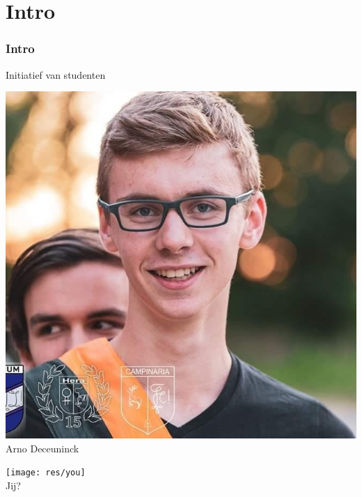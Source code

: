 

\section{Intro}
\addtocounter{minutes}{2}
\begin{frame}%
	\frametitle{Intro}%
    Initiatief van studenten
	\vspace{0.2cm}
	
   	\centering%
    \begin{minipage}{0.30\linewidth}%
        \centering%
        \noindent\includegraphics[width=\linewidth]{res/arno} \\%
        \footnotesize Arno Deceuninck \strut%
    \end{minipage}
    \begin{minipage}{0.30\linewidth}%
        \centering%
		\texttt{[image: res/you]} \\%
        \footnotesize Jij? \strut%
    \end{minipage}
    \begin{minipage}{0.30\linewidth}%
        \centering%

\end{minipage}
\end{frame}
